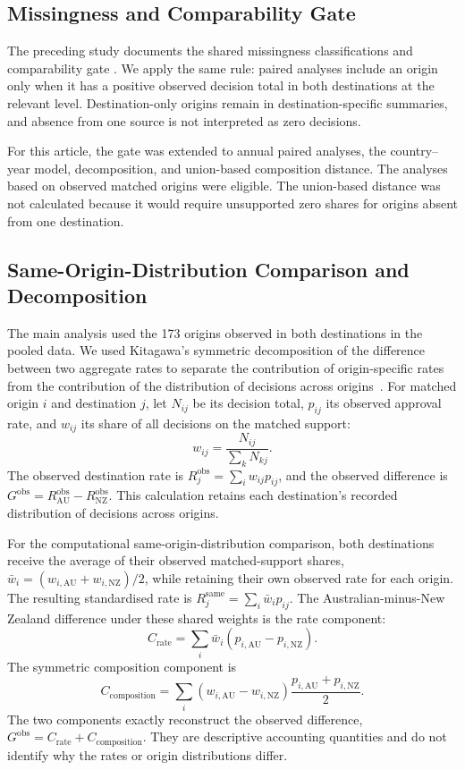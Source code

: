 \documentclass[runningheads]{llncs}
\begin{document}
\subsection{Missingness and Comparability Gate}

The preceding study documents the shared missingness classifications and comparability gate \cite{Kaplan2026AUNZDecisionOutcomes}. We apply the same rule: paired analyses include an origin only when it has a positive observed decision total in both destinations at the relevant level. Destination-only origins remain in destination-specific summaries, and absence from one source is not interpreted as zero decisions.

For this article, the gate was extended to annual paired analyses, the country--year model, decomposition, and union-based composition distance. The analyses based on observed matched origins were eligible. The union-based distance was not calculated because it would require unsupported zero shares for origins absent from one destination.

\subsection{Same-Origin-Distribution Comparison and Decomposition}

The main analysis used the 173 origins observed in both destinations in the pooled data. We used Kitagawa's symmetric decomposition of the difference between two aggregate rates to separate the contribution of origin-specific rates from the contribution of the distribution of decisions across origins~\cite{Kitagawa1955}. For matched origin $i$ and destination $j$, let $N_{ij}$ be its decision total, $p_{ij}$ its observed approval rate, and $w_{ij}$ its share of all decisions on the matched support:
\[
w_{ij}=\frac{N_{ij}}{\sum_{k}N_{kj}}.
\]
The observed destination rate is $R_j^{\mathrm{obs}}=\sum_i w_{ij}p_{ij}$, and the observed difference is $G^{\mathrm{obs}}=R_{\mathrm{AU}}^{\mathrm{obs}}-R_{\mathrm{NZ}}^{\mathrm{obs}}$. This calculation retains each destination's recorded distribution of decisions across origins.

For the computational same-origin-distribution comparison, both destinations receive the average of their observed matched-support shares, $\bar{w}_i=(w_{i,\mathrm{AU}}+w_{i,\mathrm{NZ}})/2$, while retaining their own observed rate for each origin. The resulting standardised rate is $R_j^{\mathrm{same}}=\sum_i\bar{w}_ip_{ij}$. The Australian-minus-New Zealand difference under these shared weights is the rate component:
\[
C_{\mathrm{rate}}=\sum_i\bar{w}_i(p_{i,\mathrm{AU}}-p_{i,\mathrm{NZ}}).
\]
The symmetric composition component is
\[
C_{\mathrm{composition}}=\sum_i(w_{i,\mathrm{AU}}-w_{i,\mathrm{NZ}})
\frac{p_{i,\mathrm{AU}}+p_{i,\mathrm{NZ}}}{2}.
\]
The two components exactly reconstruct the observed difference, $G^{\mathrm{obs}}=C_{\mathrm{rate}}+C_{\mathrm{composition}}$. They are descriptive accounting quantities and do not identify why the rates or origin distributions differ.
\end{document}
